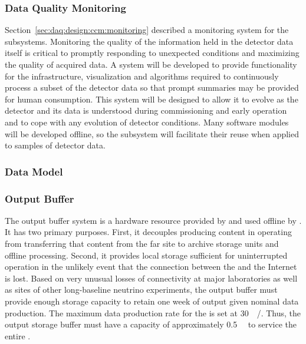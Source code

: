 \subsubsection{Data Quality Monitoring}
\label{sec:fd-daq:design-data-quality}

Section~\ref{sec:daq:design:ccm:monitoring} described a monitoring system for the  subsystems. 
Monitoring the quality of the information held in the detector data itself is critical to promptly responding to unexpected conditions and maximizing the quality of acquired data. 
A   system will be developed to provide functionality for the infrastructure, visualization and algorithms required to continuously process a subset of the detector data so that prompt summaries may be provided for human consumption.
This system will be designed to allow it to evolve as the detector and its data is understood during commissioning and early operation and to cope with any evolution of detector conditions.
Many software modules will be developed offline, so the  subsystem will facilitate their reuse when applied to samples of detector data.


\subsubsection{Data Model}
\label{sec:fd-daq:design-data-model}


\subsubsection{Output Buffer}


The output buffer system is a hardware resource provided by  and used offline by . 
It has two primary purposes. 
First, it decouples producing content in operating  from transferring that content from the far site to archive storage units and offline processing. 
Second, it provides local storage sufficient for uninterrupted  operation in the unlikely event that the connection between the  and the Internet is lost. 
Based on very unusual losses of connectivity at major laboratories as well as  sites of other long-baseline neutrino experiments, the output buffer must provide enough storage capacity to retain one week of output given nominal data production. 
The maximum data production rate for the  is set at \SI{30}{\peta\byte/\year}. 
Thus, the output storage buffer must have a capacity of approximately \SI{0.5}{\peta\byte} to service the entire .


